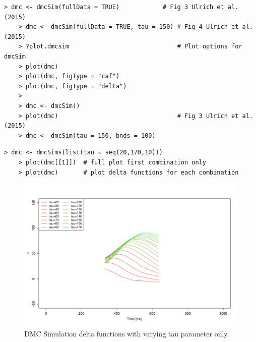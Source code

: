 \begin{minipage}{\linewidth}
    \begin{lstlisting}[style = R, title = {R Code Example 2: Calling dmcSim and plotting output}, captionpos = t]
    > dmc <- dmcSim(fullData = TRUE)            # Fig 3 Ulrich et al. (2015)
    > dmc <- dmcSim(fullData = TRUE, tau = 150) # Fig 4 Ulrich et al. (2015)
    > ?plot.dmcsim                              # Plot options for dmcSim 
    > plot(dmc)
    > plot(dmc, figType = "caf")    
    > plot(dmc, figType = "delta")
    > 
    > dmc <- dmcSim()                            
    > plot(dmc)                                 # Fig 3 Ulrich et al. (2015)
    > dmc <- dmcSim(tau = 150, bnds = 100)                            
    \end{lstlisting}
\end{minipage}

\begin{minipage}{\linewidth}
    \begin{lstlisting}[style = R, title = {R Code Example 3: Calling dmcSims and plotting output}, captionpos = t]
    > dmc <- dmcSims(list(tau = seq(20,170,10)))
    > plot(dmc[[1]])  # full plot first combination only
    > plot(dmc)       # plot delta functions for each combination 
    \end{lstlisting}
\end{minipage}

\begin{figure}
    \includegraphics[width=1\textwidth]{../figures/figure4.pdf}
    \caption{DMC Simulation delta functions with varying tau parameter only.}
    \label{fig:2}
\end{figure}

